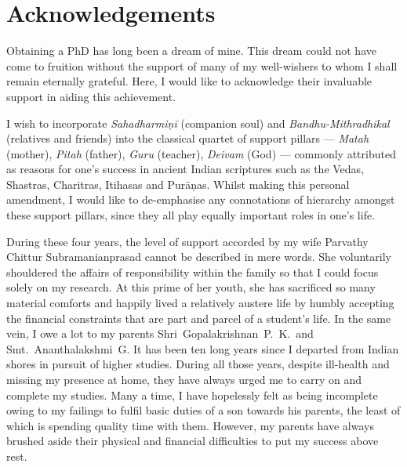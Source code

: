 
\chapter*{Acknowledgements}

Obtaining a PhD has long been a dream of mine. This dream could not have come to
fruition without the support of many of my well-wishers to whom I shall remain
eternally grateful. Here, I would like to acknowledge their invaluable support
in aiding this achievement.

I wish to incorporate \emph{Sahadharmiṇī} (companion soul) and
\emph{Bandhu-Mithradhikal} (relatives and friends) into the classical quartet of
support pillars --- \emph{Matah} (mother), \emph{Pitah} (father), \emph{Guru}
(teacher), \emph{Deivam} (God) --- commonly attributed as reasons for one's
success in ancient Indian scriptures such as the Vedas, Shastras, Charitras,
Itihasas and Purāṇas. Whilst making this personal amendment, I would like to
de-emphasise any connotations of hierarchy amongst these support pillars, since
they all play equally important roles in one's life.

During these four years, the level of support accorded by my wife Parvathy
Chittur Subramanianprasad cannot be described in mere words. She voluntarily
shouldered the affairs of responsibility within the family so that I could focus
solely on my research. At this prime of her youth, she has sacrificed so many
material comforts and happily lived a relatively austere life by humbly
accepting the financial constraints that are part and parcel of a student's
life. In the same vein, I owe a lot to my parents Shri~Gopalakrishnan~P.~K.\ and
Smt.~Ananthalakshmi~G. It has been ten long years since I departed from Indian
shores in pursuit of higher studies. During all those years, despite ill-health
and missing my presence at home, they have always urged me to carry on and
complete my studies. Many a time, I have hopelessly felt as being incomplete
owing to my failings to fulfil basic duties of a son towards his parents, the
least of which is spending quality time with them. However, my parents have
always brushed aside their physical and financial difficulties to put my success
above rest.

